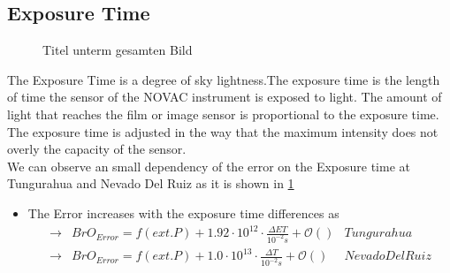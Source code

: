 \documentclass  [
  paper    = a4,
  BCOR     = 10mm,
  twoside,
  fontsize = 12pt,
  fleqn,
  toc      = bibnumbered,
  toc      = listofnumbered,
  numbers  = noendperiod,
  headings = normal,
  listof   = leveldown,
  version  = 3.03
]                                       {scrreprt}
\begin{document}
	\subsection{Exposure Time}
	\begin{figure}		
		\caption{Titel unterm gesamten Bild}
		\label{fig:diffexptime}
	\end{figure}
	The Exposure Time is a degree of sky lightness.The  exposure time is the length of time the sensor of the NOVAC instrument is exposed to light. The amount of light that reaches the film or image sensor is proportional to the exposure time. The exposure time is adjusted in the way that the maximum intensity does not overly the capacity of the sensor.\\
	We can observe an small dependency of the  error on the Exposure time at Tungurahua and Nevado Del Ruiz as it is shown in \cref{fig:diffexptime}
	

	\begin{itemize}
		\item The  Error increases with the exposure time differences as\\
		\begin{align*}
		\rightarrow&  BrO_{Error} = f(ext. P)+ 1.92\cdot10^{12}\cdot\frac{\Delta ET}{10^{-2}s} + \mathcal{O}\left(\right) & Tungurahua\\
		\rightarrow&  BrO_{Error} = f(ext. P)+ 1.0\cdot10^{13}\cdot\frac{\Delta T}{10^{-2}s} + \mathcal{O}\left(\right) & Nevado Del Ruiz\\
		\end{align*}
	\end{itemize}
\end{document}
